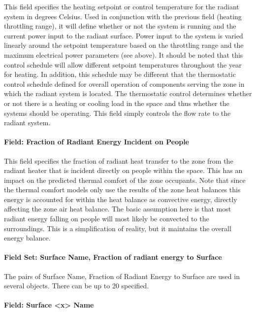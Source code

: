 This field specifies the heating setpoint or control temperature for the radiant system in degrees Celsius. Used in conjunction with the previous field (heating throttling range), it will define whether or not the system is running and the current power input to the radiant surface. Power input to the system is varied linearly around the setpoint temperature based on the throttling range and the maximum electrical power parameters (see above). It should be noted that this control schedule will allow different setpoint temperatures throughout the year for heating. In addition, this schedule may be different that the thermostatic control schedule defined for overall operation of components serving the zone in which the radiant system is located. The thermostatic control determines whether or not there is a heating or cooling load in the space and thus whether the systems should be operating. This field simply controls the flow rate to the radiant system.

\paragraph{Field: Fraction of Radiant Energy Incident on People}\label{field-fraction-of-radiant-energy-incident-on-people-3}

This field specifies the fraction of radiant heat transfer to the zone from the radiant heater that is incident directly on people within the space. This has an impact on the predicted thermal comfort of the zone occupants. Note that since the thermal comfort models only use the results of the zone heat balances this energy is accounted for within the heat balance as convective energy, directly affecting the zone air heat balance. The basic assumption here is that most radiant energy falling on people will most likely be convected to the surroundings. This is a simplification of reality, but it maintains the overall energy balance.

\paragraph{Field Set: Surface Name, Fraction of radiant energy to Surface}\label{field-set-surface-name-fraction-of-radiant-energy-to-surface-3}

The pairs of Surface Name, Fraction of Radiant Energy to Surface are used in several objects. There can be up to 20 specified.

\paragraph{Field: Surface \textless{}x\textgreater{} Name}\label{field-surface-x-name-3}

